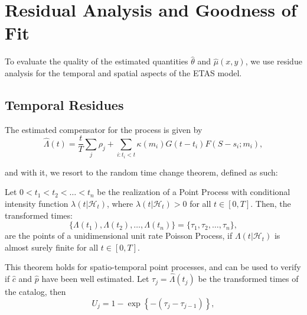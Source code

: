 \section{Residual Analysis and Goodness of Fit}
\label{sec-residue-analysis}

To evaluate the quality of the estimated quantities $\hat{\theta}$ and $\hat{\mu}(x,y)$, we use residue analysis for the temporal and spatial aspects of the ETAS model.

\subsection{Temporal Residues}
\label{subsec-temporal-resid}

The estimated compensator for the process is given by
\begin{equation}
  \label{eq-est-compensator}
  \hat{\Lambda}(t) = \frac{t}{T}\sum_{j}\rho_{j} + \sum_{i: t_{i} < t}\kappa(m_{i})G(t - t_{i})F(S - s_{i};m_{i}),
\end{equation}

\noindent and with it, we resort to the random time change theorem, defined as such:

\begin{theorem}
  \label{teo-mudanca-tempo}
  Let $0 < t_{1} < t_{2} < \ldots < t_{n}$ be the realization of a Point Process with conditional intensity function $\lambda(t|\mathcal{H}_{t})$, where $\lambda(t|\mathcal{H}_{t}) > 0$ for all $t \in [0,T]$. Then, the transformed times:
  \begin{equation*}
    \{\Lambda(t_{1}), \Lambda(t_{2}), \ldots, \Lambda(t_{n})\} = \{\tau_{1},\tau_{2},\ldots,\tau_{n}\},
  \end{equation*}
  are the points of a unidimensional unit rate Poisson Process, if $\Lambda(t|\mathcal{H}_{t})$ is almost surely finite for all $t \in [0,T]$.
\end{theorem}

This theorem holds for spatio-temporal point processes, and can be used to verify if $\hat{c}$ and $\hat{p}$ have been well estimated. Let $\tau_{j} = \hat{\Lambda}(t_{j})$ be the transformed times of the catalog, then
\begin{equation*}
U_{j} = 1 - \exp\left\{-(\tau_{j} - \tau_{j - 1})\right\},
\end{equation*}

